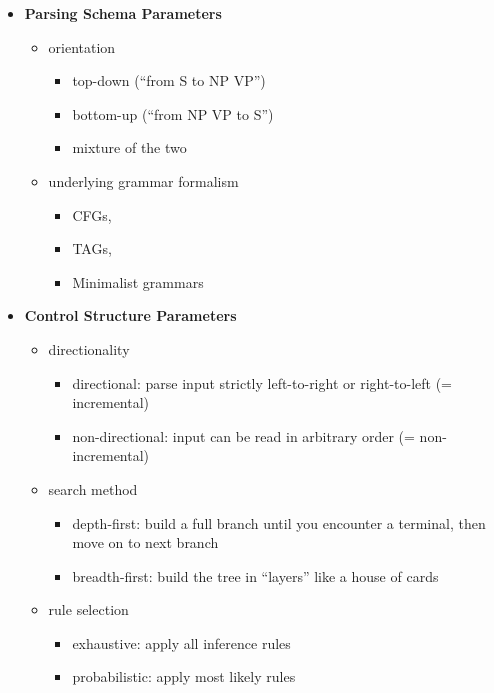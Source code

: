 \begin{itemize}
    \item \textbf{Parsing Schema Parameters}
        \begin{itemize}
            \item orientation
                \begin{itemize}
                    \item top-down (``from S to NP VP'')
                    \item bottom-up (``from NP VP to S'')
                    \item mixture of the two
                \end{itemize}
            \item underlying grammar formalism
                \begin{itemize}
                    \item CFGs,
                    \item TAGs,
                    \item Minimalist grammars
                \end{itemize}
        \end{itemize}
    \item \textbf{Control Structure Parameters}
        \begin{itemize}
            \item directionality
                \begin{itemize}
                    \item directional: parse input strictly left-to-right or right-to-left (= incremental)
                    \item non-directional: input can be read in arbitrary order (= non-incremental)
                \end{itemize}
            \item search method
                \begin{itemize}
                    \item depth-first: build a full branch until you encounter a terminal, then move on to next branch
                    \item breadth-first: build the tree in ``layers'' like a house of cards
                \end{itemize}
            \item rule selection
                \begin{itemize}
                    \item exhaustive: apply all inference rules
                    \item probabilistic: apply most likely rules
                \end{itemize}
        \end{itemize}
\end{itemize}

